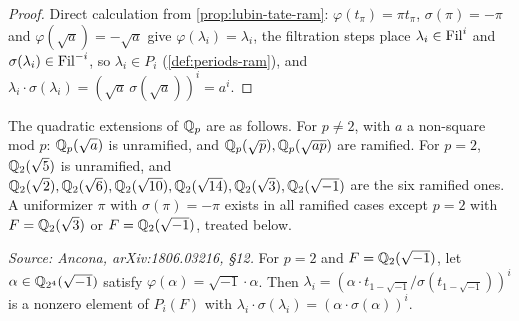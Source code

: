 \begin{proof}
  Direct calculation from \cref{prop:lubin-tate-ram}: \(\varphi(t_\pi) = \pi
  t_\pi\), \(\sigma(\pi) = -\pi\) and \(\varphi(\sqrt{a}) = -\sqrt{a}\) give
  \(\varphi(\lambda_i) = \lambda_i\), the filtration steps place
  \(\lambda_i \in \mathrm{Fil}^i\) and \(\sigma(\lambda_i) \in \mathrm{Fil}^{-i}\), so
  \(\lambda_i \in P_i\) (\cref{def:periods-ram}), and \(\lambda_i \cdot
  \sigma(\lambda_i) = (\sqrt{a}\,\sigma(\sqrt{a}))^i = a^i\).
\end{proof}

\begin{remark}
  The quadratic extensions of \(\mathbb{Q}_p\) are as follows. For \(p \neq 2\), with
  \(a\) a non-square mod \(p\): \(\mathbb{Q}_p(\sqrt{a})\) is unramified, and
  \(\mathbb{Q}_p(\sqrt{p}), \mathbb{Q}_p(\sqrt{ap})\) are ramified. For \(p = 2\),
  \(\mathbb{Q}_2(\sqrt 5)\) is unramified, and \(\mathbb{Q}_2(\sqrt 2), \mathbb{Q}_2(\sqrt 6),
  \mathbb{Q}_2(\sqrt{10}), \mathbb{Q}_2(\sqrt{14}), \mathbb{Q}_2(\sqrt 3), \mathbb{Q}_2(\sqrt{-1})\) are the six
  ramified ones. A uniformizer \(\pi\) with \(\sigma(\pi) = -\pi\) exists in all
  ramified cases except \(p = 2\) with \(F = \mathbb{Q}_2(\sqrt 3)\) or
  \(F = \Q_2(\sqrt{-1})\), treated below.
\end{remark}

\begin{corollary}[Explicit period, \(F = \Q_2(\sqrt{-1})\)]
  \label{cor:period-wild}
  \textit{Source: Ancona, arXiv:1806.03216, \S12.}
  For \(p = 2\) and \(F = \Q_2(\sqrt{-1})\), let \(\alpha \in
  \mathbb{Q}_{2^4}(\sqrt{-1})\) satisfy \(\varphi(\alpha) = \sqrt{-1} \cdot \alpha\).
  Then \(\lambda_i = (\alpha \cdot t_{1-\sqrt{-1}}/\sigma(t_{1-\sqrt{-1}}))^i\)
  is a nonzero element of \(P_i(F)\) with
  \(\lambda_i \cdot \sigma(\lambda_i) = (\alpha \cdot \sigma(\alpha))^i\).
\end{corollary}

